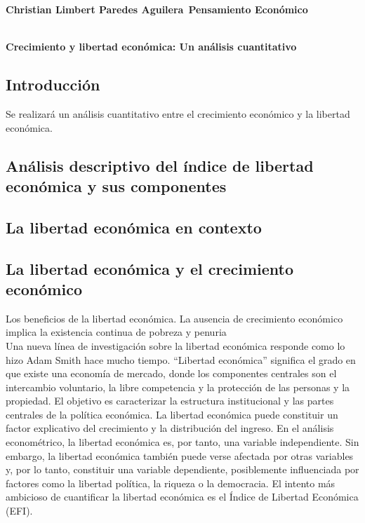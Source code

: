 \textbf{Christian Limbert Paredes Aguilera}\
\textbf{Pensamiento Económico}\\\\
\begin{center}
\textbf{\Large Crecimiento y libertad económica: Un análisis cuantitativo}\\
\end{center}
\vspace{1cm}

    \subsection*{Introducción}
    Se realizará un análisis cuantitativo entre el crecimiento económico y la libertad económica.
    \subsection*{Análisis descriptivo del índice de libertad económica y sus componentes}
    \subsection*{La libertad económica en contexto}
    \subsection*{La libertad económica y el crecimiento económico}

    Los beneficios de la libertad económica.
    La ausencia de crecimiento económico implica la existencia continua de pobreza y penuria\\
    Una nueva línea de investigación sobre la libertad económica responde como lo hizo Adam Smith hace mucho tiempo. “Libertad económica” significa el grado en que existe una economía de mercado, donde los componentes centrales son el intercambio voluntario, la libre competencia y la protección de las personas y la propiedad. El objetivo es caracterizar la estructura institucional y las partes centrales de la política económica. La libertad económica puede constituir un factor explicativo del crecimiento y la distribución del ingreso. En el análisis econométrico, la libertad económica es, por tanto, una variable independiente. Sin embargo, la libertad económica también puede verse afectada por otras variables y, por lo tanto, constituir una variable dependiente, posiblemente influenciada por factores como la libertad política, la riqueza o la democracia. El intento más ambicioso de cuantificar la libertad económica es el Índice de Libertad Económica (EFI). \\

